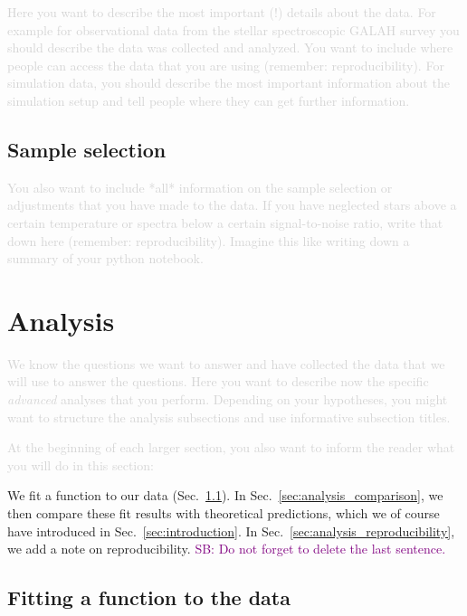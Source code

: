 \documentclass[twocolumn,apj,numberedappendix,appendixfloats]{openjournal}
\newcommand{\SB}[1]{{\textcolor{purple}{SB: #1}}}
\newcommand{\comment}[1]{\textcolor{lightgray}{#1}}
\begin{document}
\comment{Here you want to describe the most important (!) details about the data. For example for observational data from the stellar spectroscopic GALAH survey \citep{Buder2018, Buder2021, Buder2024b} you should describe the data was collected and analyzed. You want to include where people can access the data that you are using (remember: reproducibility). For simulation data, you should describe the most important information about the simulation setup and tell people where they can get further information.}

\subsection{Sample selection} \label{sec:data_selection}

\comment{You also want to include *all* information on the sample selection or adjustments that you have made to the data. If you have neglected stars above a certain temperature or spectra below a certain signal-to-noise ratio, write that down here (remember: reproducibility). Imagine this like writing down a summary of your python notebook.}

\clearpage
\section{Analysis} \label{sec:analysis}

\comment{We know the questions we want to answer and have collected the data that we will use to answer the questions. Here you want to describe now the specific \textit{advanced} analyses that you perform. Depending on your hypotheses, you might want to structure the analysis subsections and use informative subsection titles.}

\comment{At the beginning of each larger section, you also want to inform the reader what you will do in this section:}

We fit a function to our data (Sec.~\ref{sec:analysis_fitting}). In Sec.~\ref{sec:analysis_comparison}, we then compare these fit results with theoretical predictions, which we of course have introduced in Sec.~\ref{sec:introduction}. In Sec.~\ref{sec:analysis_reproducibility}, we add a note on reproducibility. \SB{Do not forget to delete the last sentence.}

\subsection{Fitting a function to the data} \label{sec:analysis_fitting}
\end{document}
